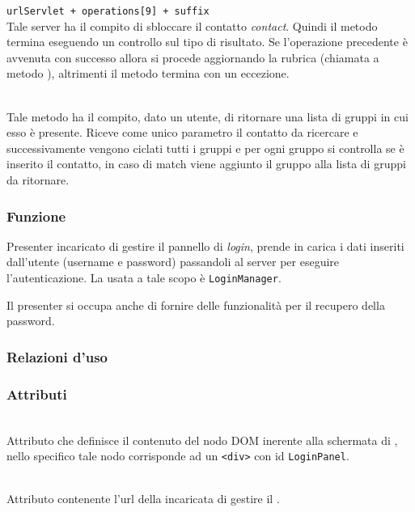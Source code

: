 \begin{description}
\verb|urlServlet + operations[9] + suffix|\\

Tale server ha il compito di sbloccare il contatto \textit{contact}. Quindi il metodo termina eseguendo un controllo sul tipo di risultato. Se l'operazione precedente è avvenuta con successo allora si procede aggiornando la rubrica (chiamata a metodo ), altrimenti il metodo termina con un eccezione.

\item{}\\
Tale metodo ha il compito, dato un utente, di ritornare una lista di gruppi in cui esso è presente. Riceve come unico parametro il contatto da ricercare e successivamente vengono ciclati tutti i gruppi e per ogni gruppo si controlla se è inserito il contatto, in caso di match viene aggiunto il gruppo alla lista di gruppi da ritornare.


\end{description}


\subsubsection*{Funzione}
Presenter incaricato di gestire il pannello di \textit{login}, prende in carica i dati inseriti dall'utente (username e password) passandoli al server per eseguire l'autenticazione. La  usata a tale scopo è \texttt{LoginManager}.

Il presenter si occupa anche di fornire delle funzionalità per il recupero della password.

\subsubsection*{Relazioni d'uso}

\subsubsection*{Attributi}
\begin{description}

  \item{}\\
  Attributo che definisce il contenuto del nodo DOM inerente alla schermata di , nello specifico tale nodo corrisponde ad un \texttt{<div>} con id \texttt{LoginPanel}.
  \item{}\\
  Attributo contenente l'url della  incaricata di gestire il .

\end{description}

